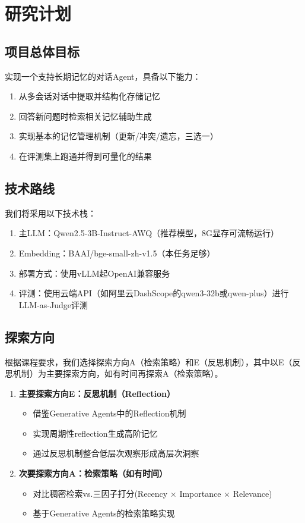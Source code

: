 \documentclass[11pt]{article}
\begin{document}
\section{研究计划}

\subsection{项目总体目标}

实现一个支持长期记忆的对话Agent，具备以下能力：

\begin{enumerate}
\item 从多会话对话中提取并结构化存储记忆
\item 回答新问题时检索相关记忆辅助生成
\item 实现基本的记忆管理机制（更新/冲突/遗忘，三选一）
\item 在评测集上跑通并得到可量化的结果
\end{enumerate}

\subsection{技术路线}

我们将采用以下技术栈：

\begin{enumerate}
\item 主LLM：Qwen2.5-3B-Instruct-AWQ（推荐模型，8G显存可流畅运行）
\item Embedding：BAAI/bge-small-zh-v1.5（本任务足够）
\item 部署方式：使用vLLM起OpenAI兼容服务
\item 评测：使用云端API（如阿里云DashScope的qwen3-32b或qwen-plus）进行LLM-as-Judge评测
\end{enumerate}

\subsection{探索方向}

根据课程要求，我们选择探索方向A（检索策略）和E（反思机制），其中以E（反思机制）为主要探索方向，如有时间再探索A（检索策略）。

\begin{enumerate}
\item \textbf{主要探索方向E：反思机制（Reflection）}
\begin{itemize}
\item 借鉴Generative Agents中的Reflection机制
\item 实现周期性reflection生成高阶记忆
\item 通过反思机制整合低层次观察形成高层次洞察
\end{itemize}

\item \textbf{次要探索方向A：检索策略（如有时间）}
\begin{itemize}
\item 对比稠密检索vs.三因子打分(Recency × Importance × Relevance)
\item 基于Generative Agents的检索策略实现
\end{itemize}
\end{enumerate}
\end{document}
